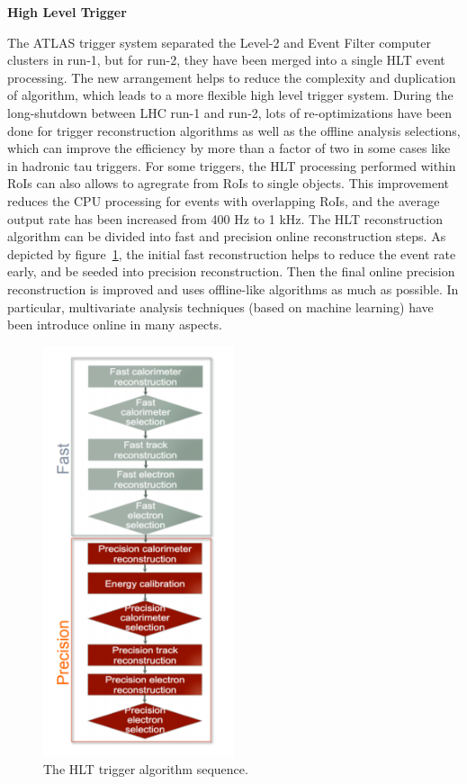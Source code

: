 \textbf{High Level Trigger}

The ATLAS trigger system separated the Level-2 and Event Filter computer clusters in run-1, but for run-2, they have been merged into a single HLT event processing.
The new arrangement helps to reduce the complexity and duplication of algorithm, which leads to a more flexible high level trigger system.
During the long-shutdown between LHC run-1 and run-2, lots of re-optimizations have been done for trigger reconstruction algorithms as well as the offline analysis selections,
which can improve the efficiency by more than a factor of two in some cases like in hadronic tau triggers.
For some triggers, the HLT processing performed within RoIs can also allows to agregrate from RoIs to single objects. 
This improvement reduces the CPU processing for events with overlapping RoIs, and the average output rate has been increased from 400 Hz to 1 kHz.
The HLT reconstruction algorithm can be divided into fast and precision online reconstruction steps. 
As depicted by figure~\ref{fig:trig_alg}, the initial fast reconstruction helps to reduce the event rate early, and be seeded into precision reconstruction.
Then the final online precision reconstruction is improved and uses offline-like algorithms as much as possible.
In particular, multivariate analysis techniques (based on machine learning) have been introduce online in many aspects.
\begin{figure}[!htb]
  \centering
  \includegraphics[width=0.5\textwidth]{figures/Detector/trig_alg.png}
  \caption{ The HLT trigger algorithm sequence\cite{Pasztor:2063746}.}
  \label{fig:trig_alg}
\end{figure}
